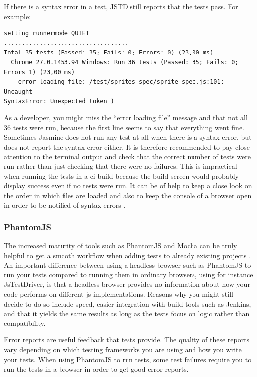 \documentclass[11pt]{article}
\begin{document}
If there is a syntax error in a test, JSTD still reports that the tests pass. For example:

\begin{verbatim}
setting runnermode QUIET
...................................
Total 35 tests (Passed: 35; Fails: 0; Errors: 0) (23,00 ms)
  Chrome 27.0.1453.94 Windows: Run 36 tests (Passed: 35; Fails: 0;
Errors 1) (23,00 ms)
    error loading file: /test/sprites-spec/sprite-spec.js:101: Uncaught
SyntaxError: Unexpected token )
\end{verbatim}

As a developer, you might miss the ``error loading file'' message and that not all 36 tests were run, because the first line seems to say that everything went fine. Sometimes Jasmine does not run any test at all when there is a syntax error, but does not report the syntax error either. It is therefore recommended to pay close attention to the terminal output and check that the correct number of tests were run rather than just checking that there were no failures. This is impractical when running the tests in a \gls{ci} build because the build screen would probably display success even if no tests were run. It can be of help to keep a close look on the order in which files are loaded and also to keep the console of a browser open in order to be notified of syntax errors \cite{MikeJansen}.

\subsubsection{PhantomJS}

The increased maturity of tools such as PhantomJS and Mocha can be truly helpful to get a smooth workflow when adding tests to already existing projects \cite[questions~11-12 and 20]{Edelstam}. An important difference between using a headless browser such as PhantomJS to run your tests compared to running them in ordinary browsers, using for instance JsTestDriver, is that a headless browser provides no information about how your code performs on different \gls{js} implementations. Reasons why you might still decide to do so include speed, easier integration with build tools such as Jenkins, and that it yields the same results as long as the tests focus on logic rather than compatibility. \cite[questions~13-15]{Edelstam}

Error reports are useful feedback that tests provide. The quality of these reports vary depending on which testing frameworks you are using and how you write your tests. When using PhantomJS to run tests, some test failures require you to run the tests in a browser in order to get good error reports. \cite[question~12]{Edelstam}
\end{document}
